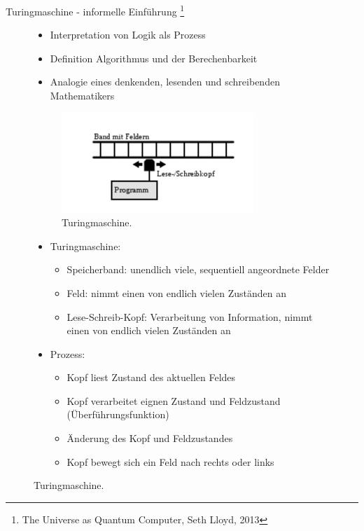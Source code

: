 \documentclass[aspectratio=1610, 9pt]{beamer}
\begin{document}
\begin{frame}{Turingmaschine - informelle Einführung \footnote[8]{The Universe as Quantum Computer, Seth Lloyd, 2013}}
  \begin{figure}
    \begin{minipage}{0.49\textwidth}
      \begin{itemize}
        \item Interpretation von Logik als Prozess
        \item Definition Algorithmus und der Berechenbarkeit
        \item Analogie eines denkenden, lesenden und schreibenden Mathematikers
      \end{itemize}
      \begin{figure}
        \includegraphics[width=0.8\textwidth]{images/turing.png}
        \caption{Turingmaschine. \footnotemark[9]}
      \end{figure}
    \end{minipage}
    \hfill
    \begin{minipage}{0.49\textwidth}
      \begin{itemize}
        \item Turingmaschine:
        \begin{itemize}
          \item Speicherband: unendlich viele, sequentiell angeordnete Felder
          \item Feld: nimmt einen von endlich vielen Zuständen an
          \item Lese-Schreib-Kopf: Verarbeitung von Information, nimmt einen von endlich vielen Zuständen an
        \end{itemize}
        \item Prozess:
        \begin{itemize}
          \item Kopf liest Zustand des aktuellen Feldes
          \item Kopf verarbeitet eignen Zustand und Feldzustand \\ (Überführungsfunktion)
          \item Änderung des Kopf und Feldzustandes
          \item Kopf bewegt sich ein Feld nach rechts oder links
        \end{itemize}
      \end{itemize}
    \end{minipage}
  \end{figure}
\end{frame}
\end{document}
